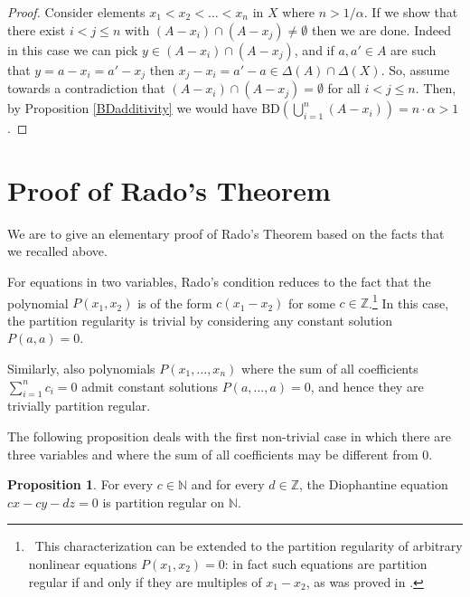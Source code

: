 \documentclass[a4paper,oneside]{article}
\newcommand{\N}{\mathbb{N}}
\newcommand{\Z}{\mathbb{Z}}
\theoremstyle{definition}
\newtheorem{proposition}[theorem]{Proposition}
\theoremstyle{named}
\begin{document}
\begin{proof}
Consider elements $x_1<x_2<\ldots<x_n$ in $X$ where $n>1/\alpha$.
If we show that there exist $i<j\le n$ with $(A-x_i)\cap(A-x_j)\ne\emptyset$ then
we are done. Indeed in this case we can pick $y\in(A-x_i)\cap(A-x_j)$, and
if $a,a'\in A$ are such that $y=a-x_i=a'-x_j$ then $x_j-x_i=a'-a\in\Delta(A)\cap\Delta(X)$.
So, assume towards a contradiction that $(A-x_i)\cap(A-x_j)=\emptyset$ for all $i<j\le n$.
Then, by Proposition \ref{BDadditivity} we would have
$\text{BD}(\bigcup_{i=1}^n(A-x_i))=n\cdot\alpha>1$.
\end{proof}


\section{Proof of Rado's Theorem}\label{proof}

We are to give an elementary proof of Rado's Theorem based
on the facts that we recalled above. 

For equations in two variables, Rado's condition reduces to the fact that 
the polynomial $P(x_1,x_2)$ is of the form
$c(x_1-x_2)$ for some $c\in\Z$.\footnote
{~This characterization can be extended to the partition regularity of arbitrary 
nonlinear equations $P(x_{1},x_{2})=0$: in fact such equations are partition 
regular if and only if they are multiples of $x_{1}-x_{2}$, as was proved in \cite{lba}.} 
In this case, the partition regularity is trivial by considering any constant solution
$P(a,a)=0$. 
 
Similarly, also polynomials $P(x_1,\ldots,x_n)$ where
the sum of all coefficients $\sum_{i=1}^nc_i=0$ admit constant solutions $P(a,\ldots,a)=0$,
and hence they are trivially partition regular.

The following proposition deals with the first non-trivial case in which
there are three variables and where the sum of all coefficients may be different from 0.

\begin{proposition}\label{3variables}
For every $c\in\N$ and for every $d\in\Z$, the Diophantine equation $cx-cy-dz=0$ 
is partition regular on $\N$. 
\end{proposition}
\end{document}
